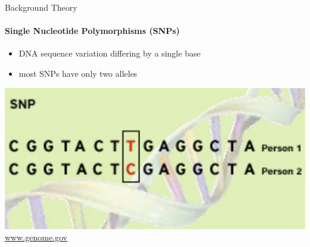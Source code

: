 \documentclass[letter,graphicx]{beamer}
\def\Tiny{\fontsize{3pt}{3pt} \selectfont}
\begin{document}
\begin{frame}{Background Theory}
\framesubtitle{Single Nucleotide Polymorphisms (SNPs)}
\begin{itemize}
\item DNA sequence variation differing by a single base
\vspace{2mm}
\item most SNPs have only two alleles 
\end{itemize}
\vspace{3mm}
\begin{center}
\includegraphics[width=.6\textwidth]{images/snp_diagram2} \\
\Tiny \url{www.genome.gov}
\end{center}
\end{frame}
\end{document}

